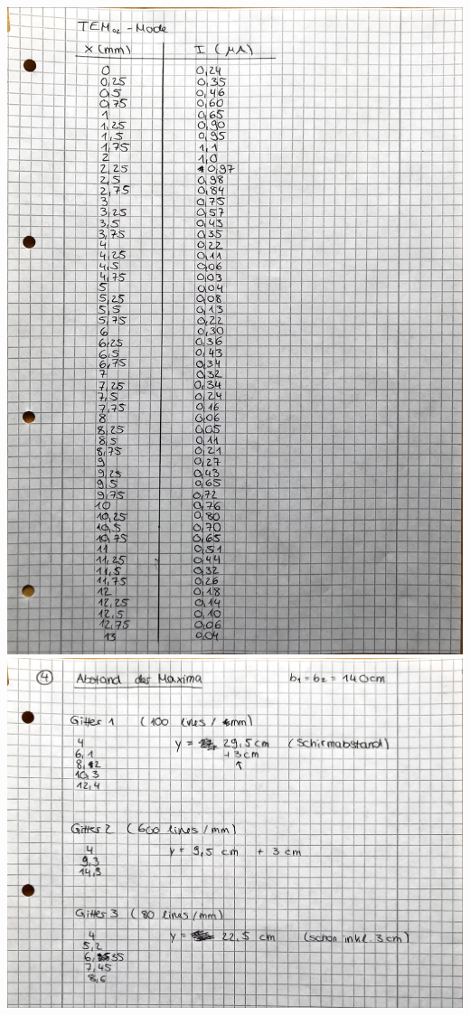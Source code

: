 \includegraphics[width=\textwidth]{fotos/Messung_TEM02.JPG}
\includegraphics[width=\textwidth]{fotos/Messung_Maxima.JPG}
